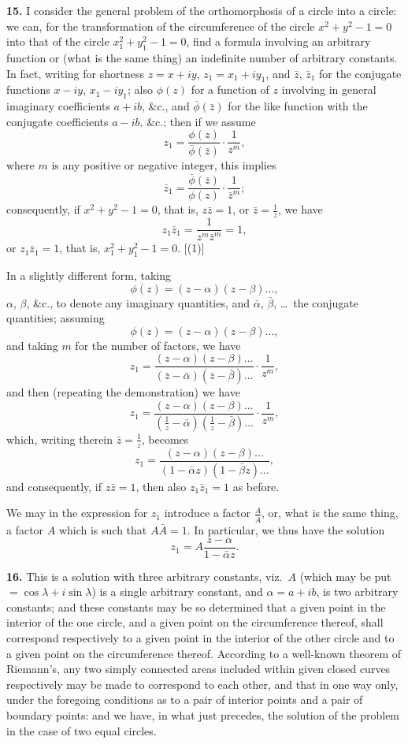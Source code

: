 \documentclass[12pt,a4paper]{article}
\begin{document}
\textbf{15.} I consider the general problem of the orthomorphosis of a circle into a
circle: we can, for the transformation of the circumference of the circle $x^2 + y^2 - 1 = 0$
into that of the circle $x_1^2 + y_1^2 - 1 = 0$, find a formula involving an arbitrary function
or (what is the same thing) an indefinite number of arbitrary constants. In fact,
writing for shortness $z = x + iy$, $z_1 = x_1 + iy_1$, and $\bar{z}$, $\bar{z}_1$ for the conjugate functions
$x - iy$, $x_1 - iy_1$; also $\phi(z)$ for a function of $z$ involving in general imaginary coefficients
$a + ib$, \&c., and $\bar{\phi}(\bar{z})$ for the like function with the conjugate coefficients
$a - ib$, \&c.; then if we assume
\[
z_1 = \frac{\phi(z)}{\bar{\phi}(\bar{z})} \cdot \frac{1}{z^m},
\]
where $m$ is any positive or negative integer, this implies
\[
\bar{z}_1 = \frac{\bar{\phi}(\bar{z})}{\phi(z)} \cdot \frac{1}{\bar{z}^m};
\]
consequently, if $x^2 + y^2 - 1 = 0$, that is, $z\bar{z} = 1$, or $\bar{z} = \frac{1}{z}$, we have
\[
z_1\bar{z}_1 = \frac{1}{z^m\bar{z}^m} = 1,
\]
or $z_1\bar{z}_1 = 1$, that is, $x_1^2 + y_1^2 - 1 = 0$. \hfill [(1)]

In a slightly different form, taking
\[
\phi(z) = (z - \alpha)(z - \beta)\ldots,
\]
$\alpha$, $\beta$, \&c., to denote any imaginary quantities,
and $\bar{\alpha}$, $\bar{\beta}$, \ldots\ the conjugate quantities; assuming
\[
\phi(z) = (z - \alpha)(z - \beta) \ldots,
\]
and taking $m$ for the number of factors, we have
\[
z_1 = \frac{(z - \alpha)(z - \beta)\ldots}{(\bar{z} - \bar{\alpha})(\bar{z} - \bar{\beta})\ldots} \cdot \frac{1}{z^m},
\]
and then (repeating the demonstration) we have
\[
z_1 = \frac{(z - \alpha)(z - \beta)\ldots}{(\frac{1}{z} - \bar{\alpha})(\frac{1}{z} - \bar{\beta})\ldots} \cdot \frac{1}{z^m},
\]
which, writing therein $\bar{z} = \frac{1}{z}$, becomes
\[
z_1 = \frac{(z - \alpha)(z - \beta)\ldots}{(1 - \bar{\alpha}z)(1 - \bar{\beta}z)\ldots},
\]
and consequently, if $z\bar{z} = 1$, then also $z_1\bar{z}_1 = 1$ as before.

We may in the expression for $z_1$ introduce a factor $\frac{A}{\bar{A}}$, or, what is the same
thing, a factor $A$ which is such that $A\bar{A} = 1$. In particular, we thus have the solution
\[
z_1 = A\frac{z - \alpha}{1 - \bar{\alpha}z}.
\]

\newpage
\textbf{16.} This is a solution with three arbitrary constants, viz.~$A$ (which may be
put $= \cos\lambda + i\sin\lambda$) is a single arbitrary constant, and $\alpha = a + ib$, is two arbitrary
constants; and these constants may be so determined that a given point in the
interior of the one circle, and a given point on the circumference thereof, shall
correspond respectively to a given point in the interior of the other circle and to a
given point on the circumference thereof. According to a well-known theorem of
Riemann's, any two simply connected areas included within given closed curves
respectively may be made to correspond to each other, and that in one way only,
under the foregoing conditions as to a pair of interior points and a pair of boundary
points: and we have, in what just precedes, the solution of the problem in the case
of two equal circles.
\end{document}
